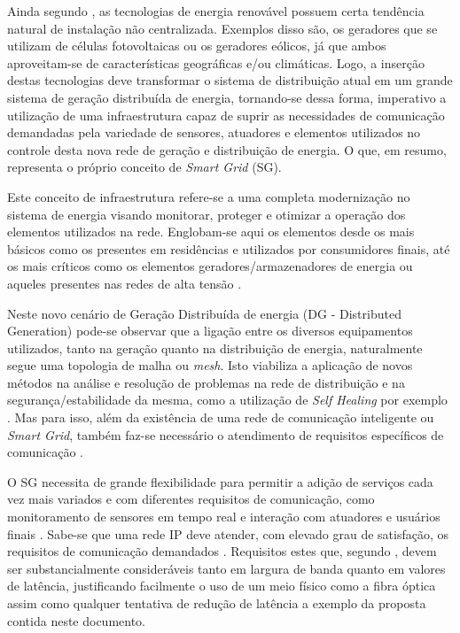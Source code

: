 \documentclass[12pt]{article}
\begin{document}
Ainda segundo \cite{Art_Gungor2013}, as tecnologias de energia renovável possuem certa tendência natural de instalação não centralizada. Exemplos disso são, os geradores que se utilizam de células fotovoltaicas ou os geradores eólicos, já que ambos aproveitam-se de características geográficas e/ou climáticas. Logo, a inserção destas tecnologias deve transformar o sistema de distribuição atual em um grande sistema de geração distribuída de energia, tornando-se dessa forma, imperativo a utilização de uma infraestrutura capaz de suprir as necessidades de comunicação demandadas pela variedade de sensores, atuadores e elementos utilizados no controle desta nova rede de geração e distribuição de energia. O que, em resumo, representa o próprio conceito de \emph{Smart Grid} (SG).

Este conceito de infraestrutura refere-se a uma completa modernização no sistema de energia visando monitorar, proteger e otimizar a operação dos elementos utilizados na rede. Englobam-se aqui os elementos desde os mais básicos como os presentes em residências e utilizados por consumidores finais, até os mais críticos como os elementos geradores/armazenadores de energia ou aqueles presentes nas redes de alta tensão \cite{Conf_Sood2009}.

Neste novo cenário de Geração Distribuída de energia (DG - Distributed Generation) pode-se observar que a ligação entre os diversos equipamentos utilizados, tanto na geração quanto na distribuição de energia, naturalmente segue uma topologia de malha ou \emph{mesh}. Isto viabiliza a aplicação de novos métodos na análise e resolução de problemas na rede de distribuição e na segurança/estabilidade da mesma, como a utilização de \emph{Self Healing} por exemplo \cite{Art_Amin2006}. Mas para isso, além da existência de uma rede de comunicação inteligente ou \emph{Smart Grid}, também faz-se necessário o atendimento de requisitos específicos de comunicação \cite{Conf_Sood2009}.

O SG necessita de grande flexibilidade para permitir a adição de serviços cada vez mais variados e com diferentes requisitos de comunicação, como monitoramento de sensores em tempo real e interação com atuadores e usuários finais \cite{Art_Aggarwal2010}. Sabe-se que uma rede IP deve atender, com elevado grau de satisfação, os requisitos de comunicação demandados \cite{Conf_Lobo2008}. Requisitos estes que, segundo \cite{Art_Aggarwal2010}, devem ser substancialmente consideráveis tanto em largura de banda quanto em valores de latência, justificando facilmente o uso de um meio físico como a fibra óptica assim como qualquer tentativa de redução de latência a exemplo da proposta contida neste documento.
\end{document}
